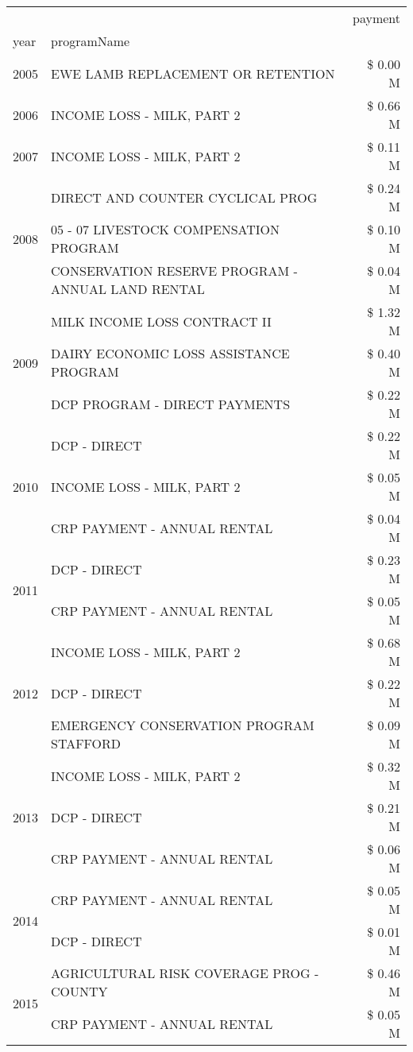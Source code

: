 \begin{tabular}{llr}
\toprule
 &  & payment \\
year & programName &  \\
\midrule
2005 & EWE LAMB REPLACEMENT OR RETENTION & \$ 0.00 M \\
\cline{1-3}
2006 & INCOME LOSS - MILK, PART 2 & \$ 0.66 M \\
\cline{1-3}
2007 & INCOME LOSS - MILK, PART 2 & \$ 0.11 M \\
\cline{1-3}
\multirow[t]{3}{*}{2008} & DIRECT AND COUNTER CYCLICAL PROG & \$ 0.24 M \\
 & 05 - 07 LIVESTOCK COMPENSATION PROGRAM & \$ 0.10 M \\
 & CONSERVATION RESERVE PROGRAM - ANNUAL LAND RENTAL & \$ 0.04 M \\
\cline{1-3}
\multirow[t]{3}{*}{2009} & MILK INCOME LOSS CONTRACT II & \$ 1.32 M \\
 & DAIRY ECONOMIC LOSS ASSISTANCE PROGRAM & \$ 0.40 M \\
 & DCP PROGRAM - DIRECT PAYMENTS & \$ 0.22 M \\
\cline{1-3}
\multirow[t]{3}{*}{2010} & DCP - DIRECT & \$ 0.22 M \\
 & INCOME LOSS - MILK, PART 2 & \$ 0.05 M \\
 & CRP PAYMENT - ANNUAL RENTAL & \$ 0.04 M \\
\cline{1-3}
\multirow[t]{2}{*}{2011} & DCP - DIRECT & \$ 0.23 M \\
 & CRP PAYMENT - ANNUAL RENTAL & \$ 0.05 M \\
\cline{1-3}
\multirow[t]{3}{*}{2012} & INCOME LOSS - MILK, PART 2 & \$ 0.68 M \\
 & DCP - DIRECT & \$ 0.22 M \\
 & EMERGENCY CONSERVATION PROGRAM STAFFORD & \$ 0.09 M \\
\cline{1-3}
\multirow[t]{3}{*}{2013} & INCOME LOSS - MILK, PART 2 & \$ 0.32 M \\
 & DCP - DIRECT & \$ 0.21 M \\
 & CRP PAYMENT - ANNUAL RENTAL & \$ 0.06 M \\
\cline{1-3}
\multirow[t]{2}{*}{2014} & CRP PAYMENT - ANNUAL RENTAL & \$ 0.05 M \\
 & DCP - DIRECT & \$ 0.01 M \\
\cline{1-3}
\multirow[t]{2}{*}{2015} & AGRICULTURAL RISK COVERAGE PROG - COUNTY & \$ 0.46 M \\
 & CRP PAYMENT - ANNUAL RENTAL & \$ 0.05 M \\
\cline{1-3}

\end{tabular}

